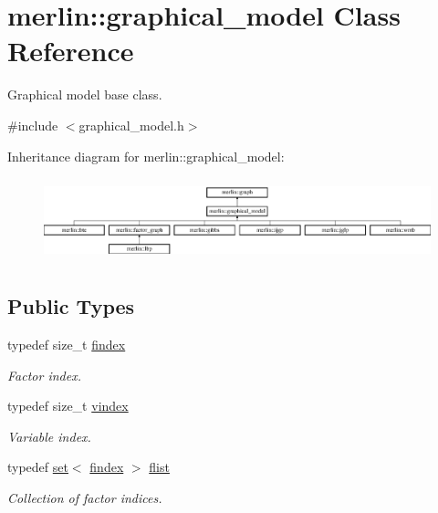 \hypertarget{classmerlin_1_1graphical__model}{}\section{merlin\+:\+:graphical\+\_\+model Class Reference}
\label{classmerlin_1_1graphical__model}


Graphical model base class.  




{\ttfamily \#include $<$graphical\+\_\+model.\+h$>$}

Inheritance diagram for merlin\+:\+:graphical\+\_\+model\+:\begin{figure}[H]
\begin{center}
\leavevmode
\includegraphics[height=2.440087cm]{classmerlin_1_1graphical__model}
\end{center}
\end{figure}
\subsection*{Public Types}
\begin{DoxyCompactItemize}
\item 
typedef size\+\_\+t \hyperlink{classmerlin_1_1graphical__model_ab2b46f09d8142bb68f243ecadbdabb6b}{findex}\hypertarget{classmerlin_1_1graphical__model_ab2b46f09d8142bb68f243ecadbdabb6b}{}\label{classmerlin_1_1graphical__model_ab2b46f09d8142bb68f243ecadbdabb6b}

\begin{DoxyCompactList}\small\item\em Factor index. \end{DoxyCompactList}\item 
typedef size\+\_\+t \hyperlink{classmerlin_1_1graphical__model_a275006a490bc09239c12a4d93d53b135}{vindex}\hypertarget{classmerlin_1_1graphical__model_a275006a490bc09239c12a4d93d53b135}{}\label{classmerlin_1_1graphical__model_a275006a490bc09239c12a4d93d53b135}

\begin{DoxyCompactList}\small\item\em Variable index. \end{DoxyCompactList}\item 
typedef \hyperlink{classmerlin_1_1set}{set}$<$ \hyperlink{classmerlin_1_1graphical__model_ab2b46f09d8142bb68f243ecadbdabb6b}{findex} $>$ \hyperlink{classmerlin_1_1graphical__model_a615e25ec6594615fddfd4c3c4776b99f}{flist}\hypertarget{classmerlin_1_1graphical__model_a615e25ec6594615fddfd4c3c4776b99f}{}\label{classmerlin_1_1graphical__model_a615e25ec6594615fddfd4c3c4776b99f}

\begin{DoxyCompactList}\small\item\em Collection of factor indices. \end{DoxyCompactList}\end{DoxyCompactItemize}
